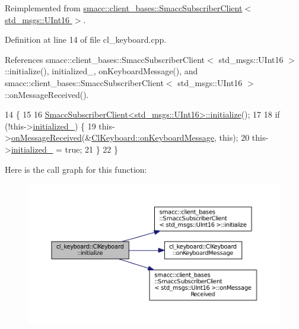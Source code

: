 Reimplemented from \hyperlink{classsmacc_1_1client__bases_1_1SmaccSubscriberClient_af188f0f5e89de26a07e1f964cdd23a70}{smacc\+::client\+\_\+bases\+::\+Smacc\+Subscriber\+Client$<$ std\+\_\+msgs\+::\+U\+Int16 $>$}.



Definition at line 14 of file cl\+\_\+keyboard.\+cpp.



References smacc\+::client\+\_\+bases\+::\+Smacc\+Subscriber\+Client$<$ std\+\_\+msgs\+::\+U\+Int16 $>$\+::initialize(), initialized\+\_\+, on\+Keyboard\+Message(), and smacc\+::client\+\_\+bases\+::\+Smacc\+Subscriber\+Client$<$ std\+\_\+msgs\+::\+U\+Int16 $>$\+::on\+Message\+Received().


\begin{DoxyCode}
14                             \{
15 
16   \hyperlink{classsmacc_1_1client__bases_1_1SmaccSubscriberClient_af188f0f5e89de26a07e1f964cdd23a70}{SmaccSubscriberClient<std\_msgs::UInt16>::initialize}();
17 
18   \textcolor{keywordflow}{if} (!this->\hyperlink{classcl__keyboard_1_1ClKeyboard_a96128ed5180e0dc5cfe76c90a9f8e8f7}{initialized\_}) \{
19     this->\hyperlink{classsmacc_1_1client__bases_1_1SmaccSubscriberClient_a4f02251e3a161fb6d802b154b1081f18}{onMessageReceived}(&\hyperlink{classcl__keyboard_1_1ClKeyboard_aff50ebe6b1b4aad0ea5b933ab0f00ef4}{ClKeyboard::onKeyboardMessage}, \textcolor{keyword}{
      this});
20     this->\hyperlink{classcl__keyboard_1_1ClKeyboard_a96128ed5180e0dc5cfe76c90a9f8e8f7}{initialized\_} = \textcolor{keyword}{true};
21   \}
22 \}
\end{DoxyCode}


Here is the call graph for this function\+:
\nopagebreak
\begin{figure}[H]
\begin{center}
\leavevmode
\includegraphics[width=350pt]{classcl__keyboard_1_1ClKeyboard_af7f7fd9871ef5fcca400cd59d7b60775_cgraph}
\end{center}
\end{figure}


